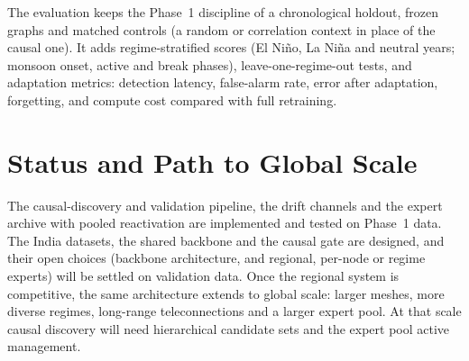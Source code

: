 The evaluation keeps the Phase~1 discipline of a chronological holdout, frozen graphs and matched controls (a random or correlation context in place of the causal one). It adds regime-stratified scores (El Ni\~{n}o, La Ni\~{n}a and neutral years; monsoon onset, active and break phases), leave-one-regime-out tests, and adaptation metrics: detection latency, false-alarm rate, error after adaptation, forgetting, and compute cost compared with full retraining.

\section{Status and Path to Global Scale}
\label{sec:p2-status}

The causal-discovery and validation pipeline, the drift channels and the expert archive with pooled reactivation are implemented and tested on Phase~1 data. The India datasets, the shared backbone and the causal gate are designed, and their open choices (backbone architecture, and regional, per-node or regime experts) will be settled on validation data. Once the regional system is competitive, the same architecture extends to global scale: larger meshes, more diverse regimes, long-range teleconnections and a larger expert pool. At that scale causal discovery will need hierarchical candidate sets and the expert pool active management.
